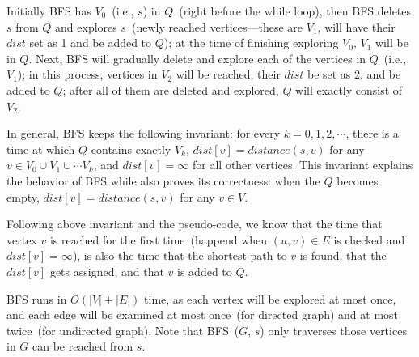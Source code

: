 


Initially BFS has $V_0$~(i.e., $s$) in $Q$~(right before the while loop), 
then BFS deletes $s$ from $Q$ and explores $s$~(newly reached vertices---these are $V_1$, will have their $dist$ set as 1 and be added to $Q$);
at the time of finishing exploring $V_0$, $V_1$ will be in $Q$. 
Next, BFS will gradually delete and explore each of the vertices in $Q$~(i.e., $V_1$);
in this process, vertices in $V_2$ will be reached, their $dist$ be set as 2, and be added to $Q$;
after all of them are deleted and explored, $Q$ will exactly consist of $V_2$.

In general, BFS keeps the following invariant: for every $k = 0, 1, 2, \cdots$, 
there is a time at which $Q$ contains exactly $V_k$, $dist[v] = distance(s, v)$ for any $v\in V_0\cup V_1\cup \cdots V_k$,
and $dist[v] = \infty$ for all other vertices.
This invariant explains the behavior of BFS while also proves its correctness:
when the $Q$ becomes empty, $dist[v] = distance(s, v)$ for any $v\in V$.

Following above invariant and the pseudo-code, we know that the time that vertex $v$ is reached for the first time~(happend when $(u,v)\in E$ is checked and $dist[v] = \infty$),
is also the time that the shortest path to $v$ is found, that the $dist[v]$ gets assigned, and that $v$ is added to $Q$.

\begin{algorithmblock}[0.8\textwidth]
	\xxx
	\xxx
	\xxx
	\xxx
	\xxx
	\xxx
	\xxx
	\xxx
	\xxx
	\xxx
	\xxx
	\xxx
\end{algorithmblock}



BFS runs in $O(|V| + |E|)$ time, as each vertex will be explored at most once, and each 
edge will be examined at most once~(for directed graph) and at most twice~(for undirected graph).
Note that BFS~($G$, $s$) only traverses those vertices in $G$ can be reached from $s$.


